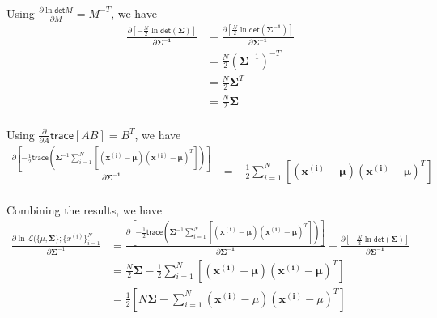 \documentclass[11pt]{article}
\begin{document}
{\ \\
Using $\frac{\partial \ln\mathsf{det}M}{\partial M} = M^{-T}$, we have
\begin{equation}
    \begin{split}
        \frac{\partial \left[-\frac{N}{2}\ln\mathsf{det}(\mathbf{\Sigma})\right]}{\partial \mathbf{
	 	  \Sigma^{-1}}}&= \frac{\partial \left[\frac{N}{2}\ln\mathsf{det}(\mathbf{\Sigma^{-1}})\right]}{
	 	  \partial \mathbf{
	 	  \Sigma^{-1}}}\\&=\frac{N}{2}(\mathbf{\Sigma}^{-1})^{-T}\\
	 	  &= \frac{N}{2}\mathbf{\Sigma}^T\\
	 	  &= \frac{N}{2}\mathbf{\Sigma}
    \end{split}
\end{equation}
\ \\
Using $\frac{\partial}{\partial  A} \mathsf{trace}[AB]  = B^T$, we have
\begin{equation}
    \begin{split}
    \frac{\partial  \left[-\frac{1}{2} \mathsf{trace} \left (\mathbf{\Sigma}^{-1}\sum\limits_{i=1}^N [( \mathbf{x^{(i)}} - \mathbf{\mu})( \mathbf{x^{(i)}} - \mathbf{\mu})^T] \right )
	 	  \right]}{\partial \mathbf{\Sigma^{-1}}}&=-\frac{1}{2}  \sum\limits_{i=1}^N [( \mathbf{x^{(i)}} - \mathbf{\mu})( \mathbf{x^{(i)}} - \mathbf{\mu})^T] 
    \end{split}
\end{equation}
\ \\
Combining the results, we have
\begin{equation}
    \begin{split}
       \frac{\partial { \ln \mathcal{L}( \{ \mu, \mathbf{\Sigma} \}; \{ x^{(i)}\}_{i = 1}^N}}{\partial \mathbf{\Sigma}^{-1}}&= \frac{\partial  \left[-\frac{1}{2} \mathsf{trace} \left (\mathbf{\Sigma}^{-1}\sum\limits_{i=1}^N [( \mathbf{x^{(i)}} - \mathbf{\mu})( \mathbf{x^{(i)}} - \mathbf{\mu})^T] \right )
	 	  \right]}{\partial \mathbf{\Sigma^{-1}}} +\frac{\partial \left[-\frac{N}{2}\ln\mathsf{det}(\mathbf{\Sigma})\right]}{\partial \mathbf{
	 	  \Sigma^{-1}}}\\
	 	  &=\frac{N}{2}\mathbf{\Sigma}-\frac{1}{2}  \sum\limits_{i=1}^N [( \mathbf{x^{(i)}} - \mathbf{\mu})( \mathbf{x^{(i)}} - \mathbf{\mu})^T] \\
	 	  &= \frac{1}{2}\left[N\mathbf{\Sigma} - \sum\limits_{i=1}^N (\mathbf{x^{(i)}}-\mu)(\mathbf{x^{(i)}}-\mu
	 	  )^T\right] 
    \end{split}
\end{equation}

}
\end{document}
